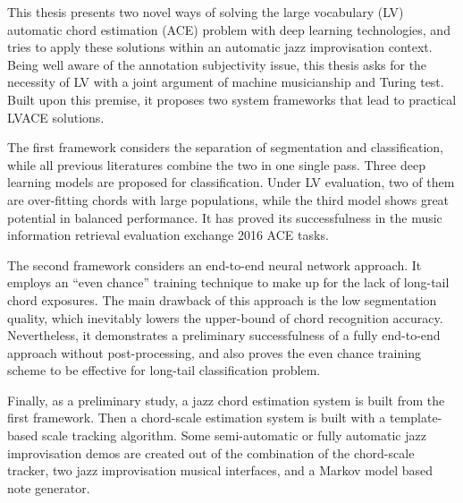 
This thesis presents two novel ways of solving the large vocabulary (LV) automatic chord estimation (ACE) problem with deep learning technologies, and tries to apply these solutions within an automatic jazz improvisation context. Being well aware of the annotation subjectivity issue, this thesis asks for the necessity of LV with a joint argument of machine musicianship and Turing test. Built upon this premise, it proposes two system frameworks that lead to practical LVACE solutions.

The first framework considers the separation of segmentation and classification, while all previous literatures combine the two in one single pass. Three deep learning models are proposed for classification. Under LV evaluation, two of them are over-fitting chords with large populations, while the third model shows great potential in balanced performance. It has proved its successfulness in the music information retrieval evaluation exchange 2016 ACE tasks.

The second framework considers an end-to-end neural network approach. It employs an ``even chance'' training technique to make up for the lack of long-tail chord exposures. The main drawback of this approach is the low segmentation quality, which inevitably lowers the upper-bound of chord recognition accuracy. Nevertheless, it demonstrates a preliminary successfulness of a fully end-to-end approach without post-processing, and also proves the even chance training scheme to be effective for long-tail classification problem.

Finally, as a preliminary study, a jazz chord estimation system is built from the first framework. Then a chord-scale estimation system is built with a template-based scale tracking algorithm. Some semi-automatic or fully automatic jazz improvisation demos are created out of the combination of the chord-scale tracker, two jazz improvisation musical interfaces, and a Markov model based note generator.
